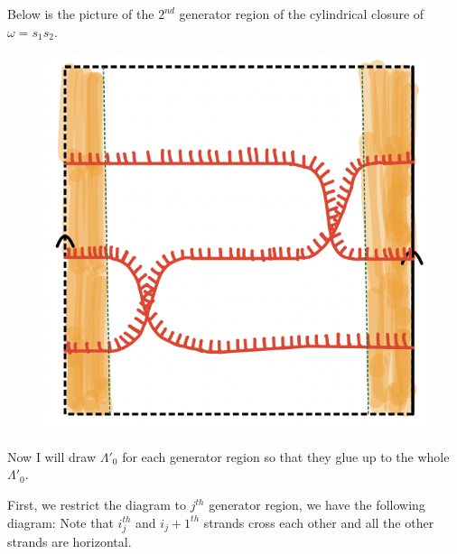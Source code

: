 Below is the picture of the $2^{nd}$ generator region of the cylindrical closure of $\omega = s_1 s_2$.

\begin{figure}[H]
    \centering
    \includegraphics[scale = 0.95]{diagrams/natural_alternating_diagrams/7-2.png}
    \caption{}
    \label{fig:your-label}
\end{figure}

Now I will draw $\Lambda'_0$ for each generator region so that they glue up to the whole $\Lambda'_0$. 

First, we restrict the diagram to $j^{th}$ generator region, we have the following diagram: Note that $i_j^{th}$ and $i_{j}+1^{th}$ strands cross each other and all the other strands are horizontal.

